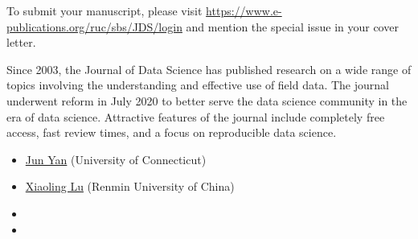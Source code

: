 \documentclass[12pt]{article}
\begin{document}
To submit your manuscript, please visit
\url{https://www.e-publications.org/ruc/sbs/JDS/login}
and mention the special issue in your cover letter.


Since 2003, the Journal of Data Science has published research on a
wide range of topics involving the understanding and effective use of
field data. The journal underwent reform in July 2020 to better serve
the data science community in the era of data science. Attractive
features of the journal include completely free access, fast review
times, and a focus on reproducible data science.


\bigskip
{}
\begin{itemize}[leftmargin=2ex, topsep=2pt,itemsep=2pt,partopsep=0pt, parsep=0pt]
\item
  \href{https://statistics.uconn.edu/person/jun-yan/}{Jun Yan} (University of Connecticut)
\item
  \href{http://stat.ruc.edu.cn/jxtd/jsdw/sjkxydsjtjx/5b900093966a43e0ab69dfbaf82e095a.htm}{Xiaoling Lu} (Renmin University of China)
\item 
\item 
\end{itemize}
\end{document}
